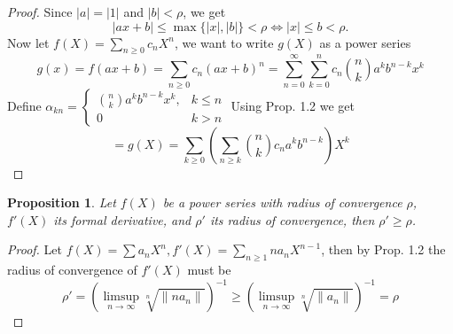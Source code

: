 \documentclass[a4paper]{article}
\theoremstyle{plain}
\newtheorem{prop}[thm]{Proposition}
\theoremstyle{definition}
\begin{document}
\begin{proof}
  Since $|a| = |1|$ and $|b| < \rho$, we get
  $$|ax + b| \leq \max\{|x|, |b|\} < \rho \iff |x| \leq b < \rho.$$
  Now let $f(X) = \sum_{n \geq 0}c_{n}X^{n}$, we want to write $g(X)$ as a power series
  $$g(x) = f(ax+b) = \sum_{n \geq 0}c_{n}(ax+b)^{n} = \sum_{n = 0}^{\infty} \sum _{k=0}^{n}c_{n}\binom nk a^{k}b^{n-k}x^{k}$$
  Define $\alpha_{kn} = \begin{cases}\binom nk a^{k}b^{n-k}x^{k}, & k \leq n \\ 0 & k > n\end{cases}$
  Using Prop. 1.2 we get $$= g(X) = \sum_{k \geq 0}\left( \sum_{n \geq k} \binom nk c_{n}a^{k}b^{n-k}\right)X^{k}$$
\end{proof}
\begin{prop}
  Let $f(X)$ be a power series with radius of convergence $\rho$, $f'(X)$ its formal derivative, and $\rho'$ its radius of convergence, then $\rho' \geq \rho$.
\end{prop}
\begin{proof}
  Let $f(X) = \sum a_{n}X^{n}, f'(X) = \sum_{n \geq 1} na_{n}X^{n-1}$, then by Prop. 1.2 the radius of convergence of $f'(X)$ must be
  $$\rho' = \left( \limsup_{n \to \infty} \sqrt[n]{\|na_{n}\|} \right)^{-1} \geq \left( \limsup_{n \to \infty} \sqrt[n]{\|a_{n}\|} \right)^{-1} = \rho$$
\end{proof}
\end{document}

